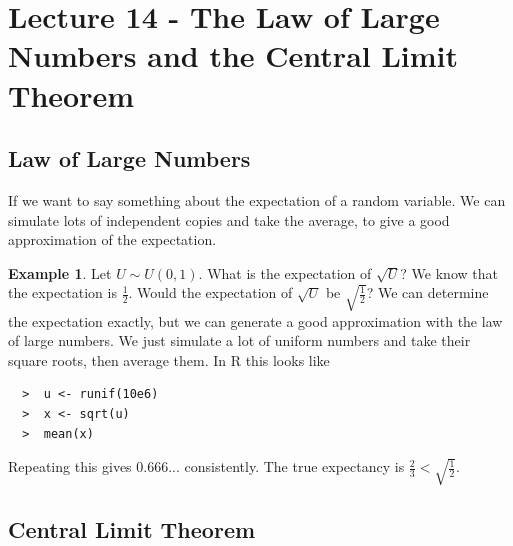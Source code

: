 \documentclass{report}
\theoremstyle{definition}
\newtheorem{example}{Example}
\theoremstyle{plain}
\newtheorem{theorem}{Theorem}
\theoremstyle{remark}
\begin{document}
\section{Lecture 14 - The Law of Large Numbers and the Central Limit Theorem}
\subsection{Law of Large Numbers}

\begin{center}
\end{center}
If we want to say something about the expectation of a random variable. We can
simulate lots of independent copies and take the average, to give a good
approximation of the expectation.

\begin{example}
  Let $ U \sim U(0,1) $. What is the expectation of \( \sqrt{U} \)? We know
  that the expectation is \( \frac{1}{2} \). Would the expectation of \(
  \sqrt{U} \) be \(\sqrt{ \frac{1}{2} }\)? We can determine the expectation
  exactly, but we can generate a good approximation with the law of large
  numbers. We just simulate a lot of uniform numbers and take their square
  roots, then average them. In R this looks like

  \begin{lstlisting}
  >  u <- runif(10e6)
  >  x <- sqrt(u)
  >  mean(x)
  \end{lstlisting}
  Repeating this gives \( 0.666... \) consistently. The true expectancy is \(
  \frac{2}{3} < \sqrt{ \frac{1}{2} } \).
\end{example}

\subsection{Central Limit Theorem}
\begin{center}
\end{center}
\end{document}
